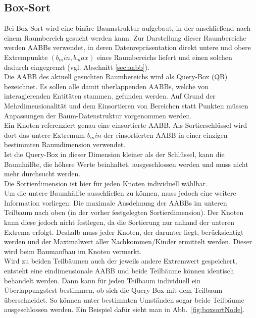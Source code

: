 \subsection{Box-Sort}
\label{sec:boxsort}
Bei Box-Sort \cite{houthuys1987box} wird eine binäre Baumstruktur aufgebaut, in der anschließend nach einem Raumbereich gesucht werden kann.
Zur Darstellung dieser Raumbereiche werden AABBs verwendet, in deren Datenrepräsentation direkt untere und obere Extrempunkte $(b_min, b_max)$ eines Raumbereichs liefert und einen solchen dadurch eingegrenzt (vgl. Abschnitt \ref{sec:aabb}).\\
Die AABB des aktuell gesuchten Raumbereichs wird als Query-Box (QB) bezeichnet.
Es sollen alle damit überlappenden AABBs, welche von interagierenden Entitäten stammen, gefunden werden.
Auf Grund der Mehrdimensionalität und dem Einsortieren von Bereichen statt Punkten müssen Anpassungen der Baum-Datenstruktur vorgenommen werden.\\
Ein Knoten referenziert genau eine einsortierte AABB. Als Sortierschlüssel wird dort das untere Extremum $b_min$ der einsortierten AABB in einer einzigen bestimmten Raumdimension verwendet.\\
Ist die Query-Box in dieser Dimension kleiner als der Schlüssel, kann die Baumhälfte, die höhere Werte beinhaltet, ausgeschlossen werden und muss nicht mehr durchsucht werden. \\
Die Sortierdimension ist hier für jeden Knoten individuell wählbar.\\
Um die untere Baumhälfte ausschließen zu können, muss jedoch eine weitere Information vorliegen: Die maximale Ausdehnung der AABBs im unteren Teilbaum nach oben (in der vorher festgelegten Sortierdimension). Der Knoten kann diese jedoch nicht festlegen, da die Sortierung nur anhand der unteren Extrema erfolgt. Deshalb muss jeder Knoten, der darunter liegt, berücksichtigt werden und der Maximalwert aller Nachkommen/Kinder ermittelt werden. Dieser wird beim Baumaufbau im Knoten vermerkt.\\
Wird zu beiden Teilbäumen auch der jeweils andere Extremwert gespeichert, entsteht eine eindimensionale AABB und beide Teilbäume können identisch behandelt werden. Dann kann für jeden Teilbaum individuell ein Überlappungstest bestimmen, ob sich die Query-Box mit dem Teilbaum überschneidet. So können unter bestimmten Umständen sogar beide Teilbäume ausgeschlossen werden. Ein Beispiel dafür sieht man in Abb.~\ref{fig:boxsortNode}.\\


